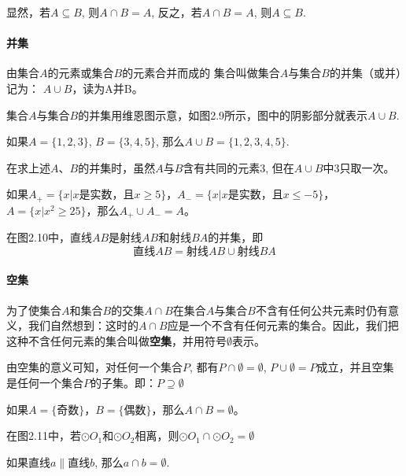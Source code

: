 显然，若$A\subseteq B$, 则$A\cap B=A$, 反之，若$A\cap B=A$, 则$A\subseteq B$.

\paragraph{并集}
由集合$A$的元素或集合$B$的元素合并而成的
集合叫做集合$A$与集合$B$的并集（或并）记为：
$A\cup B$，读为A并B。

集合$A$与集合$B$的并集用维恩图示意，如图2.9所示，图中的阴影部分就表示$A\cup B$.

如果$A=\{1, 2, 3\}$, $B=\{3, 4, 5\}$, 那么$A\cup B= \{1, 2, 3, 4, 5\}$.

\begin{rmk}
    在求上述$A$、$B$的并集时，虽然$A$与$B$含有共同的元素3, 但在$A\cup B$中3只取一次。
\end{rmk}

如果$A_+=\{x|x\text{是实数，且}x\ge 5\}$，$A_-=\{x|x\text{是实数，且}x\le -5\}$，$A=\{x|x^2\ge 25\}$，那么$A_+\cup A_-=A$。

在图2.10中，直线$AB$是射线$AB$和射线$BA$的并集，即
\[\text{直线}AB=\text{射线}AB \cup \text{射线}BA\]

\paragraph{空集}
为了使集合$A$和集合$B$的交集$A\cap B$在集合$A$与集合$B$不含有任何公共元素时仍有意义，我们自然想到：这时的$A\cap B$应是一个不含有任何元素的集合。因此，我们把这种不含任何元素的集合叫做\textbf{空集}，并用符号$\emptyset$表示。

由空集的意义可知，对任何一个集合$P$, 都有$P\cap \emptyset=\emptyset$, $P\cup\emptyset=P$成立，并且空集是任何一个集合$P$的子集。即：$P\supseteq \emptyset$

如果$A=\{\text{奇数}\}$，$B=\{\text{偶数}\}$，那么$A\cap B=\emptyset$。

在图2.11中，若$\odot O_1$和$\odot O_2$相离，则$\odot O_1\cap \odot O_2=\emptyset$
\begin{figure}[htp]
    \centering
{}
    \caption{}
\end{figure}

如果直线$a\parallel$直线$b$, 那么$a\cap b=\emptyset$.

